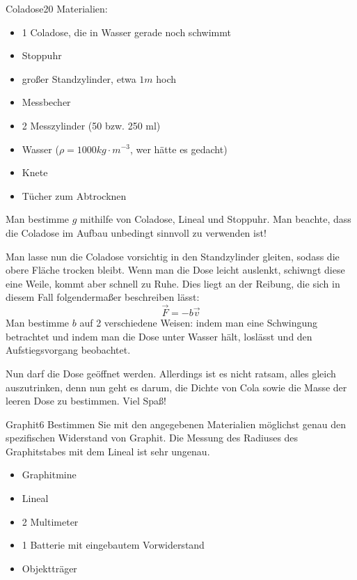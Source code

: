 \begin{problem}{Coladose}{20}
Materialien:
\begin{itemize}
\item 1 Coladose, die in Wasser gerade noch schwimmt
\item Stoppuhr
\item großer Standzylinder, etwa $1\unit{m}$ hoch
\item Messbecher
\item 2 Messzylinder (50 bzw. 250 ml)
\item Wasser ($\rho = 1000 \unit{kg \cdot m^{-3}}$, wer hätte es gedacht)
\item Knete
\item Tücher zum Abtrocknen
\end{itemize}

\begin{abcenum}
\item Man bestimme $g$ mithilfe von Coladose, Lineal und Stoppuhr. Man beachte, dass die Coladose im Aufbau unbedingt sinnvoll zu verwenden ist!
\item Man lasse nun die Coladose vorsichtig in den Standzylinder gleiten, sodass die obere Fläche trocken bleibt. Wenn man die Dose leicht auslenkt, schiwngt diese eine Weile, kommt aber schnell zu Ruhe. Dies liegt an der Reibung, die sich in diesem Fall folgendermaßer beschreiben lässt:
\[
\vec{F}=-b \vec{v}
\]
Man bestimme $b$ auf 2 verschiedene Weisen: indem man eine Schwingung betrachtet und indem man die Dose unter Wasser hält, loslässt und den Aufstiegsvorgang beobachtet.
\item Nun darf die Dose geöffnet werden. Allerdings ist es nicht ratsam, alles gleich auszutrinken, denn nun geht es darum, die Dichte von Cola sowie die Masse der leeren Dose zu bestimmen. Viel Spaß!
\end{abcenum}

% 
\end{problem}



\begin{problem}{Graphit}{6}
Bestimmen Sie mit den angegebenen Materialien möglichst genau den spezifischen Widerstand von Graphit. \hinweis Die Messung des Radiuses des Graphitstabes mit dem Lineal ist sehr ungenau.
\begin{itemize}
\item Graphitmine
\item Lineal
\item 2 Multimeter
\item 1 Batterie mit eingebautem Vorwiderstand
\item Objektträger
\end{itemize}
% 
\end{problem}



